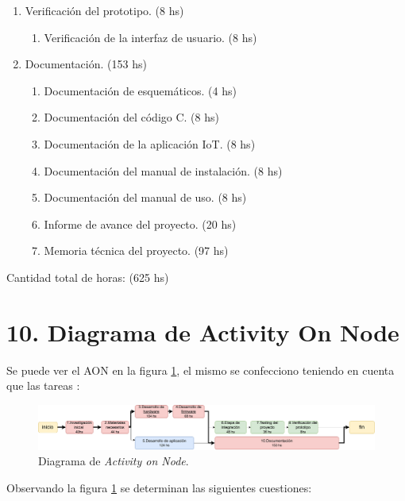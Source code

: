 \documentclass[
11pt, %
]{charter}
\begin{document}
\begin{enumerate}
\item Verificación del prototipo. (8 hs)
	\begin{enumerate}
	\item Verificación de la interfaz de usuario. (8 hs)
	\end{enumerate}	
	
\item Documentación. (153 hs)
	\begin{enumerate}
	\item Documentación de esquemáticos. (4 hs)
	\item Documentación del código C. (8 hs)
	\item Documentación de la aplicación IoT. (8 hs)
	\item Documentación del manual de instalación. (8 hs)
	\item Documentación del manual de uso. (8 hs)
	\item Informe de avance del proyecto. (20 hs)
	\item Memoria técnica del proyecto. (97 hs)

	\end{enumerate}


\end{enumerate}

Cantidad total de horas: (625 hs)

\newpage

\section{10. Diagrama de Activity On Node}
\label{sec:AoN}


Se puede ver el AON en la figura \ref{fig:AoN}, el mismo se confecciono teniendo en cuenta que las tareas :

\begin{figure}[htpb]
\centering 
\includegraphics[width=1.0 \textwidth, height=.3 \textwidth]{./Figuras/AONProyecto.pdf}
\caption{Diagrama de \textit{Activity on Node}.}
\label{fig:AoN}
\end{figure}


Observando  la figura  \ref{fig:AoN} se determinan las siguientes cuestiones:
\end{document}
